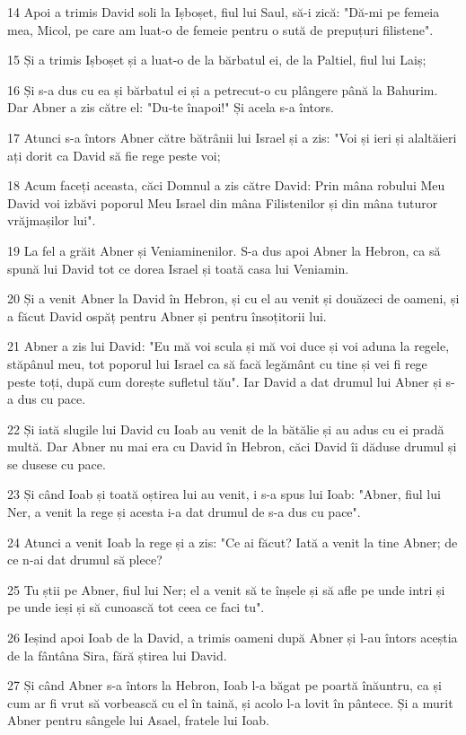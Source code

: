 \par 14 Apoi a trimis David soli la Ișboșet, fiul lui Saul, să-i zică: "Dă-mi pe femeia mea, Micol, pe care am luat-o de femeie pentru o sută de prepuțuri filistene".
\par 15 Și a trimis Ișboșet și a luat-o de la bărbatul ei, de la Paltiel, fiul lui Laiș;
\par 16 Și s-a dus cu ea și bărbatul ei și a petrecut-o cu plângere până la Bahurim. Dar Abner a zis către el: "Du-te înapoi!" Și acela s-a întors.
\par 17 Atunci s-a întors Abner către bătrânii lui Israel și a zis: "Voi și ieri și alaltăieri ați dorit ca David să fie rege peste voi;
\par 18 Acum faceți aceasta, căci Domnul a zis către David: Prin mâna robului Meu David voi izbăvi poporul Meu Israel din mâna Filistenilor și din mâna tuturor vrăjmașilor lui".
\par 19 La fel a grăit Abner și Veniaminenilor. S-a dus apoi Abner la Hebron, ca să spună lui David tot ce dorea Israel și toată casa lui Veniamin.
\par 20 Și a venit Abner la David în Hebron, și cu el au venit și douăzeci de oameni, și a făcut David ospăț pentru Abner și pentru însoțitorii lui.
\par 21 Abner a zis lui David: "Eu mă voi scula și mă voi duce și voi aduna la regele, stăpânul meu, tot poporul lui Israel ca să facă legământ cu tine și vei fi rege peste toți, după cum dorește sufletul tău". Iar David a dat drumul lui Abner și s-a dus cu pace.
\par 22 Și iată slugile lui David cu Ioab au venit de la bătălie și au adus cu ei pradă multă. Dar Abner nu mai era cu David în Hebron, căci David îi dăduse drumul și se dusese cu pace.
\par 23 Și când Ioab și toată oștirea lui au venit, i s-a spus lui Ioab: "Abner, fiul lui Ner, a venit la rege și acesta i-a dat drumul de s-a dus cu pace".
\par 24 Atunci a venit Ioab la rege și a zis: "Ce ai făcut? Iată a venit la tine Abner; de ce n-ai dat drumul să plece?
\par 25 Tu știi pe Abner, fiul lui Ner; el a venit să te înșele și să afle pe unde intri și pe unde ieși și să cunoască tot ceea ce faci tu".
\par 26 Ieșind apoi Ioab de la David, a trimis oameni după Abner și l-au întors aceștia de la fântâna Sira, fără știrea lui David.
\par 27 Și când Abner s-a întors la Hebron, Ioab l-a băgat pe poartă înăuntru, ca și cum ar fi vrut să vorbească cu el în taină, și acolo l-a lovit în pântece. Și a murit Abner pentru sângele lui Asael, fratele lui Ioab.
